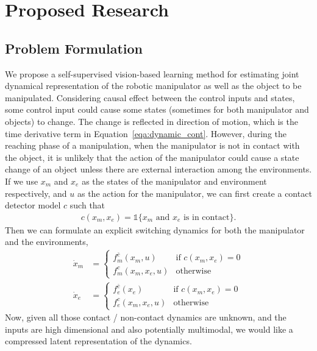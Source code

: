 \documentclass[conference]{IEEEtran}
\begin{document}
\section{Proposed Research}
\subsection{Problem Formulation}
We propose a self-supervised vision-based learning method for estimating joint
dynamical representation of the robotic manipulator as well as the object to be manipulated.
Considering causal effect between the control inputs and states, some control input
could cause some states (sometimes for both manipulator and objects) to change.
The change is reflected in direction of motion, which is the time derivative
term in Equation~\ref{eqa:dynamic_cont}. However, during the reaching phase of
a manipulation, when the manipulator is not in contact with the object, it is
unlikely that the action of the manipulator could cause a state change of an
object unless there are external interaction among the environments. If
we use $x_m$ and $x_e$ as the states of the manipulator and environment
respectively, and $u$ as the action for the manipulator, we can first
create a contact detector model $c$ such that
\begin{gather}
  c(x_m, x_e) = \mathds{1}\{\text{$x_m$ and $x_e$ is in contact}\}.
\end{gather}
Then we can formulate an explicit switching dynamics for both the manipulator
and the environments,
\begin{align}
  \label{eqa:manip_dyn}
  \dot{x}_m &= \begin{cases}
    f_m^{\bar{c}}(x_m, u) & \text{if $c(x_m, x_e) = 0$} \\
    f_m^c(x_m, x_e, u) & \text{otherwise}
  \end{cases}\\
  \label{eqa:env_dyn}
  \dot{x}_e &= \begin{cases}
    f_e^{\bar{c}}(x_e) & \text{if $c(x_m, x_e) = 0$} \\
    f_e^c(x_m, x_e, u) & \text{otherwise}
  \end{cases}
\end{align}
Now, given all those contact / non-contact dynamics are unknown, and the
inputs are high dimensional and also potentially multimodal, we would
like a compressed latent representation of the dynamics.
\end{document}

